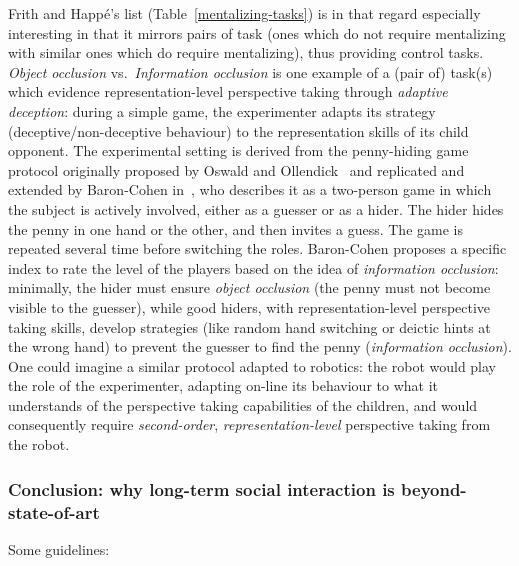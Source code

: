 \documentclass[11pt,a4paper]{report}
\begin{document}
Frith and Happé's list (Table~\ref{mentalizing-tasks}) is in that regard
especially interesting in that it mirrors pairs of task (ones which do not
require mentalizing with similar ones which do require mentalizing), thus
providing control tasks.  \emph{Object occlusion} vs.~\emph{Information
occlusion} is one example of a (pair of) task(s) which evidence
representation-level perspective taking through \emph{adaptive deception}:
during a simple game, the experimenter adapts its strategy
(deceptive/non-deceptive behaviour) to the representation skills of its child
opponent. The experimental setting is derived from the penny-hiding game
protocol originally proposed by Oswald and Ollendick~\cite{oswald1989role} and
replicated and extended by Baron-Cohen in~\cite{baron1992out}, who describes it
as a two-person game in which the subject is actively involved, either as a
guesser or as a hider. The hider hides the penny in one hand or the other, and
then invites a guess. The game is repeated several time before switching the
roles. Baron-Cohen proposes a specific index to rate the level of the players
based on the idea of \emph{information occlusion}: minimally, the hider must
ensure \emph{object occlusion} (the penny must not become visible to the
guesser), while good hiders, with representation-level perspective taking
skills, develop strategies (like random hand switching or deictic hints at the
wrong hand) to prevent the guesser to find the penny (\emph{information
occlusion}). One could imagine a similar protocol adapted to robotics: the robot
would play the role of the experimenter, adapting on-line its
behaviour to what it understands of the perspective taking capabilities of the
children, and would consequently require \emph{second-order},
\emph{representation-level} perspective taking from the robot.


\subsubsection{Conclusion: why long-term social interaction is beyond-state-of-art}



Some guidelines:

~\cite{tulli2019great}
~\cite{hoffman2019anki}

~\cite{tonkin2018design}


~\cite{baraka2019extended}
\end{document}
